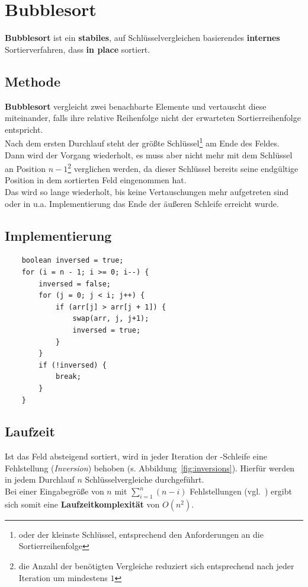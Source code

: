 \section{Bubblesort}

\textbf{Bubblesort} ist ein \textbf{stabiles}, auf Schlüsselvergleichen basierendes \textbf{internes} Sortierverfahren, dass \textbf{in place} sortiert.

\subsection{Methode}
\textbf{Bubblesort} vergleicht zwei benachbarte Elemente und vertauscht diese miteinander, falls ihre relative Reihenfolge nicht der erwarteten Sortierreihenfolge entspricht.\\
Nach dem ersten Durchlauf steht der größte  Schlüssel\footnote{oder der kleinste Schlüssel, entsprechend den Anforderungen an die Sortierreihenfolge} am Ende des Feldes.\\
Dann wird der Vorgang wiederholt, es muss aber nicht mehr mit dem Schlüssel an Position $n-1$\footnote{die Anzahl der benötigten Vergleiche reduziert sich entsprechend nach jeder Iteration um mindestens $1$} verglichen werden, da dieser Schlüssel bereits seine endgültige Position in dem sortierten Feld eingenommen hat.\\
Das wird so lange wiederholt, bis keine Vertauschungen mehr aufgetreten sind oder in u.a. Implementierung das Ende der äußeren Schleife erreicht wurde.\\

\subsection{Implementierung}

\begin{verbatim}
    boolean inversed = true;
    for (i = n - 1; i >= 0; i--) {
        inversed = false;
        for (j = 0; j < i; j++) {
            if (arr[j] > arr[j + 1]) {
                swap(arr, j, j+1);
                inversed = true;
            }
        }
        if (!inversed) {
            break;
        }
    }
\end{verbatim}

\subsection{Laufzeit}
Ist das Feld absteigend sortiert, wird in jeder Iteration der -Schleife eine Fehlstellung (\textit{Inversion}) behoben (s. Abbildung~\ref{fig:inversions}).
Hierfür werden in jedem Durchlauf $n$ Schlüsselvergleiche durchgeführt.\\
Bei einer Eingabegröße von $n$ mit $\sum_{i=1}^n (n-i)$  Fehlstellungen (vgl.~\cite[87]{OW17b}) ergibt sich somit eine \textbf{Laufzeitkomplexität} von $O(n^2)$.


